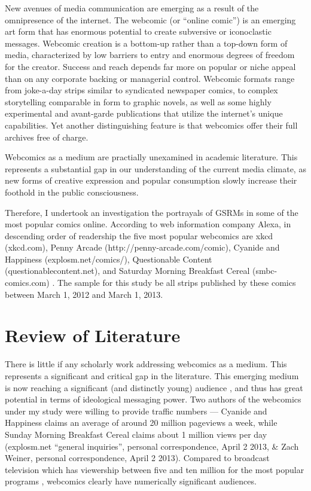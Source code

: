 \documentclass[man,12pt]{apa6}
\begin{document}
New avenues of media communication are emerging as a result of the omnipresence of the internet. The webcomic (or ``online comic'') is an emerging art form that has enormous potential to create subversive or iconoclastic messages. Webcomic creation is a bottom-up rather than a top-down form of media, characterized by low barriers to entry and enormous degrees of freedom for the creator. Success and reach depends far more on popular or niche appeal than on any corporate backing or managerial control. Webcomic formats range from joke-a-day strips similar to syndicated newspaper comics, to complex storytelling comparable in form to graphic novels, as well as some highly experimental and avant-garde publications that utilize the internet's unique capabilities. Yet another distinguishing feature is that webcomics offer their full archives free of charge. 

Webcomics as a medium are practially unexamined in academic literature. This represents a substantial gap in our understanding of the current media climate, as new forms of creative expression and popular consumption slowly increase their foothold in the public consciousness. 

Therefore, I undertook an investigation the portrayals of GSRMs in some of the most popular comics online.  According to web information company Alexa, in descending order of readership the five most popular webcomics are xkcd (xkcd.com), Penny Arcade (http://penny-arcade.com/comic), Cyanide and Happiness (explosm.net/comics/), Questionable Content (questionablecontent.net), and Saturday Morning Breakfast Cereal (smbc-comics.com) \cite{alexia}. The sample for this study be all strips published by these comics between March 1, 2012 and March 1, 2013.

\section{Review of Literature}

There is little if any scholarly work addressing webcomics as a medium. This represents a significant and critical gap in the literature. This emerging medium is now reaching a significant (and distinctly young) audience \cite{alexia}, and thus has great potential in terms of ideological messaging power. Two authors of the webcomics under my study were willing to provide traffic numbers --- Cyanide and Happiness claims an average of around 20 million pageviews a week, while Sunday Morning Breakfast Cereal claims about 1 million views per day (explosm.net ``general inquiries'', personal correspondence, April 2 2013, \& Zach Weiner, personal correspondence, April 2 2013). Compared to broadcast television which has viewership between five and ten million for the most popular programs \cite{hollywood}, webcomics clearly have numerically significant audiences.
\end{document}
